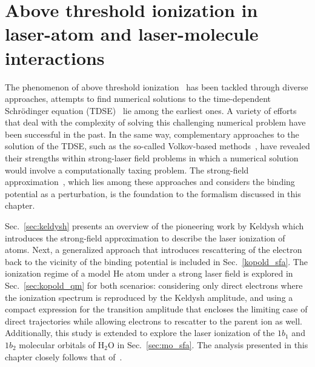 \chapter{Above threshold ionization in laser-atom and laser-molecule interactions}
\label{cha:ati}

%

The phenomenon of above threshold ionization~\cite{ATI1979} has been
tackled through diverse approaches, attempts to find numerical
solutions to the time-dependent Schr\"{o}dinger equation
(TDSE)~\cite{muller_tdse1999,scrinzi_tdse1999,Joachain2000} lie among
the earliest ones. A variety of efforts that deal with the complexity
of solving this challenging numerical problem have been successful in
the past. In the same way, complementary approaches to the solution of
the TDSE, such as the so-called Volkov-based
methods~\cite{Faisal_1973,Reiss_1980,Kaminski_1997}, have revealed
their strengths within strong-laser field problems in which a
numerical solution would involve a computationally taxing problem. The
strong-field approximation~\cite{KeldyshSFA}, which lies among these
approaches and considers the binding potential as a perturbation, is
the foundation to the formalism discussed in this chapter.

Sec.~\ref{sec:keldysh} presents an overview of the pioneering work by
Keldysh which introduces the strong-field approximation to describe
the laser ionization of atoms. Next, a generalized approach that
introduces rescattering of the electron back to the vicinity of the
binding potential is included in Sec.~\ref{kopold_sfa}. The ionization
regime of a model He atom under a strong laser field is explored in
Sec.~\ref{sec:kopold_qm} for both scenarios: considering only direct
electrons where the ionization spectrum is reproduced by the Keldysh
amplitude, and using a compact expression for the transition amplitude
that encloses the limiting case of direct trajectories while allowing
electrons to rescatter to the parent ion as well. Additionally, this
study is extended to explore the laser ionization of the $1b_{1}$ and
$1b_{2}$ molecular orbitals of H$_{2}$O in Sec.~\ref{sec:mo_sfa}. The
analysis presented in this chapter closely follows that
of~\cite{Kopold_1997sfa}.






